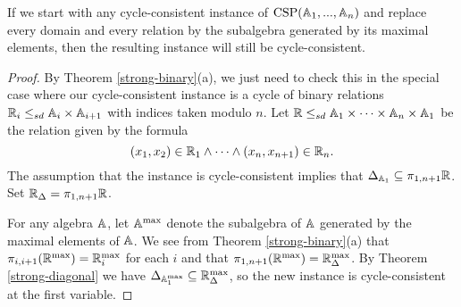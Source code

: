 \documentclass[letterpaper,11pt]{article}
\DeclareMathOperator{\CSP}{CSP}
\DeclareMathOperator{\Sg}{Sg}
\begin{document}
\begin{cor}\label{cycle-consistency-maximal} If we start with any cycle-consistent instance of $\CSP(\bA_1, ..., \bA_n)$ and replace every domain and every relation by the subalgebra generated by its maximal elements, then the resulting instance will still be cycle-consistent.
\end{cor}
\begin{proof} By Theorem \ref{strong-binary}(a), we just need to check this in the special case where our cycle-consistent instance is a cycle of binary relations $\mathbb{R}_i \le_{sd} \mathbb{A}_i\times \mathbb{A}_{i+1}$ with indices taken modulo $n$. Let $\mathbb{R} \le_{sd} \mathbb{A}_1 \times \cdots \times \mathbb{A}_n \times \mathbb{A}_1$ be the relation given by the formula
\[
(x_1,x_2) \in \mathbb{R}_1 \wedge \cdots \wedge (x_n,x_{n+1}) \in \mathbb{R}_n.
\]
The assumption that the instance is cycle-consistent implies that $\Delta_{\mathbb{A}_1} \subseteq \pi_{1,n+1} \mathbb{R}$. Set $\mathbb{R}_\Delta = \pi_{1,n+1} \mathbb{R}$.

For any algebra $\mathbb{A}$, let $\mathbb{A}^{\max}$ denote the subalgebra of $\mathbb{A}$ generated by the maximal elements of $\mathbb{A}$. We see from Theorem \ref{strong-binary}(a) that $\pi_{i,i+1}(\mathbb{R}^{\max}) = \mathbb{R}_i^{\max}$ for each $i$ and that $\pi_{1,n+1}(\mathbb{R}^{\max}) = \mathbb{R}_\Delta^{\max}$. By Theorem \ref{strong-diagonal} we have $\Delta_{\mathbb{A}_1^{\max}} \subseteq \mathbb{R}_\Delta^{\max}$, so the new instance is cycle-consistent at the first variable.
\end{proof}

\begin{comment}
\begin{lem} Fix a partial semilattice operation $s$. If $\RR \le_{sd} \bA\times \bB\times \bB$ is finite, $\bA$ is simple and generated by a maximal strongly connected component $A$, $\Delta_\bB \subseteq \pi_{23}(\RR)$, and $\RR \cap (A \times \Delta_\bB) \ne \emptyset$, then $\RR \cap (\bA\times \Delta_\bB)$ is subdirect in $\bA\times \Delta_\bB$, that is, for every $a \in \bA$ there exists a $b \in \bB$ such that $(a,b,b) \in \RR$.
\end{lem}
\begin{proof} First suppose that one of $\pi_{12}(\RR), \pi_{13}(\RR)$ is the graph of a homomorphism $\pi : \bB \twoheadrightarrow \bA$. Then for any $a \in \bA$, if we take any $b \in \pi^{-1}(a)$, then there must exist some $a' \in \bA$ such that $(a',b,b) \in \RR$ by assumption, and we must have $a' = \pi(b) = a$. Thus we may assume that $\pi_{12}(\RR)$ and $\pi_{13}(\RR)$ are both linked.

Let $R$ be a maximal strongly connected component of $\RR$ which contains some element of $A\times \Delta_\bB$ - such an $R$ exists by Theorem \ref{strong-diagonal}. Let $B$ be the projection of $R$ onto the second coordinate. Then $R \subseteq A\times B\times B$ is subdirect and closed under $s$, and by Theorem \ref{strong-binary}(c) we have $\pi_{12}(R) = \pi_{13}(R) = A\times B$, so by Theorem \ref{strong-ternary} we have $R = A\times \pi_{23}(R)$. Since $\Delta_B \subseteq \pi_{23}(R)$, we have $A\times \Delta_B \subseteq \RR$, so $\bA \times \Delta_{\Sg(B)} \le \RR$.
\end{proof}
\end{comment}
\end{document}
